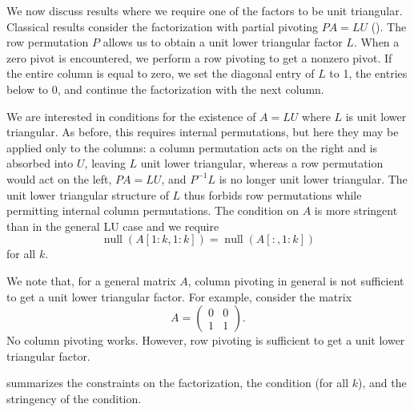 \documentclass[10pt,twoside]{siamart1116}
\DeclareMathOperator{\nl}{null}
\numberwithin{theorem}{section}
\begin{document}
We now discuss results where we require one of the factors to be unit triangular. Classical results consider the factorization with partial pivoting $PA = LU$ (). The row permutation $P$ allows us to obtain a unit lower triangular factor $L$. When a zero pivot is encountered, we perform a row pivoting to get a nonzero pivot. If the entire column is equal to zero, we set the diagonal entry of $L$ to 1, the entries below to 0, and continue the factorization with the next column.

We are interested in conditions for the existence of $A=LU$ where $L$ is unit lower triangular. As before, this requires internal permutations, but here they may be applied only to the columns: a column permutation acts on the right and is absorbed into $U$, leaving $L$ unit lower triangular, whereas a row permutation would act on the left, $PA=LU$, and $P^{-1}L$ is no longer unit lower triangular. The unit lower triangular structure of $L$ thus forbids row permutations while permitting internal column permutations. The condition on $A$ is more stringent than in the general LU case and we require
\[
  \nl(A[1:k,1:k]) = \nl(A[:,1:k])
\]
for all $k$.

We note that, for a general matrix $A$, column pivoting in general is not sufficient to get a unit lower triangular factor. For example, consider the matrix
\[
  A =
  \begin{pmatrix}
    0 & 0 \\
    1 & 1
  \end{pmatrix}.
\]
No column pivoting works. However, row pivoting is sufficient to get a unit lower triangular factor.

 summarizes the constraints on the factorization, the condition (for all $k$), and the stringency of the condition.
\end{document}
